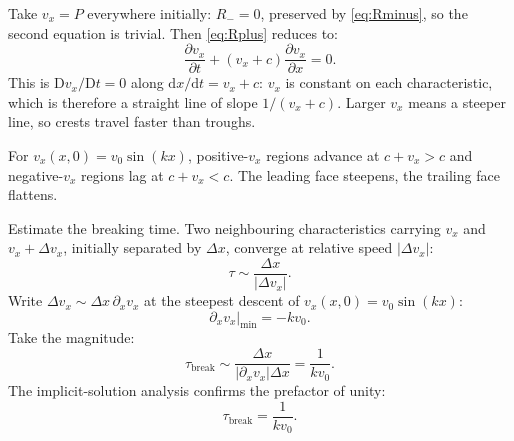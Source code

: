 \documentclass[11pt]{article}
\newcommand{\D}{\mathrm{D}}
\newcommand{\de}{\mathrm{d}}
\newcommand{\pd}[2]{\frac{\partial #1}{\partial #2}}
\begin{document}
Take $v_x=P$ everywhere initially: $R_-=0$, preserved by \eqref{eq:Rminus}, so the second equation is trivial. Then \eqref{eq:Rplus} reduces to:
\begin{equation}
\pd{v_x}{t} + (v_x+c)\pd{v_x}{x} = 0.
\label{eq:simple-wave}
\end{equation}
This is $\D v_x/\D t = 0$ along $\de x/\de t = v_x+c$: $v_x$ is constant on each characteristic, which is therefore a straight line of slope $1/(v_x+c)$. Larger $v_x$ means a steeper line, so crests travel faster than troughs.

For $v_x(x,0)=v_0\sin(kx)$, positive-$v_x$ regions advance at $c+v_x>c$ and negative-$v_x$ regions lag at $c+v_x<c$. The leading face steepens, the trailing face flattens.

\begin{center}
\end{center}

Estimate the breaking time. Two neighbouring characteristics carrying $v_x$ and $v_x+\Delta v_x$, initially separated by $\Delta x$, converge at relative speed $|\Delta v_x|$:
\[ \tau \sim \frac{\Delta x}{|\Delta v_x|}. \]
Write $\Delta v_x \sim \Delta x\,\partial_x v_x$ at the steepest descent of $v_x(x,0)=v_0\sin(kx)$:
\[ \partial_x v_x\big|_\text{min} = -kv_0. \]
Take the magnitude:
\[ \tau_\text{break} \sim \frac{\Delta x}{|\partial_x v_x|\Delta x} = \frac{1}{kv_0}. \]
The implicit-solution analysis confirms the prefactor of unity:
\begin{equation}
\boxed{\;\tau_\text{break} = \frac{1}{kv_0}.\;}
\end{equation}
\end{document}
